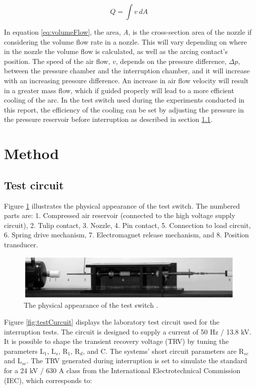 \documentclass[10pt,b5paper,twoside]{article}
\begin{document}
\begin{equation} \label{eq:volumeFlow}
Q=\int v \ dA
\end{equation}

In equation \eqref{eq:volumeFlow}, the area, \textit{A}, is the cross-section area of the nozzle if considering the volume flow rate in a nozzle. This will vary depending on where in the nozzle the volume flow is calculated, as well as the arcing contact's position. The speed of the air flow, $v$, depends on the pressure difference, $\Delta p$, between the pressure chamber and the interruption chamber, and it will increase with an increasing pressure difference. An increase in air flow velocity will result in a greater mass flow, which if guided properly will lead to a more efficient cooling of the arc. In the test switch used during the experiments conducted in this report, the efficiency of the cooling can be set by adjusting the pressure in the pressure reservoir before interruption as described in section \ref{sec:testCir}.

\cleardoublepage
\section{Method}

\subsection{Test circuit} \label{sec:testCir}

Figure \ref{fig:testSwitchRiggEq} illustrates the physical appearance of the test switch. The numbered parts are: 1. Compressed air reservoir (connected to the high voltage supply circuit), 2. Tulip contact, 3. Nozzle, 4. Pin contact, 5. Connection to load circuit, 6. Spring drive mechanism, 7. Electromagnet release mechanism, and 8. Position transducer.

\begin{figure} [H]
\centering
\includegraphics[scale=0.43]{Bilder/Method/switchTest.png}
\caption{The physical appearance of the test switch \cite{bib:AFIMVLBA}.} \label{fig:testSwitchRiggEq}
\end{figure}

Figure \ref{fig:testCurcuit} displays the laboratory test circuit used for the interruption tests. The circuit is designed to supply a current of 50 Hz / 13.8 kV. It is possible to shape the transient recovery voltage (TRV) by tuning the parameters L$_1$, L$_s$, R$_1$, R$_d$, and C. The systems' short circuit parameters are R$_{sc}$ and L$_{sc}$. The TRV generated during interruption is set to simulate the standard for a 24 kV / 630 A class from the International Electrotechnical Commission (IEC), which corresponds to:
\end{document}
